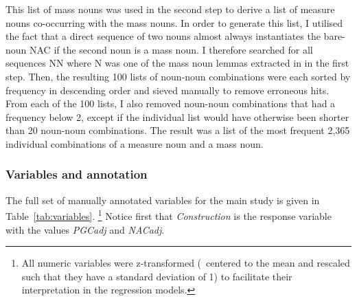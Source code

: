 This list of mass nouns was used in the second step to derive a list of measure nouns co-occurring with the mass nouns. 
In order to generate this list, I utilised the fact that a direct sequence of two nouns almost always instantiates the bare-noun NAC if the second noun is a mass noun.
I therefore searched for all sequences NN where N was one of the mass noun lemmas extracted in in the first step.
Then, the resulting 100 lists of noun-noun combinations were each sorted by frequency in descending order and sieved manually to remove erroneous hits.
From each of the 100 lists, I also removed noun-noun combinations that had a frequency below 2, except if the individual list would have otherwise been shorter than 20 noun-noun combinations.
The result was a list of the most frequent 2,365 individual combinations of a measure noun and a mass noun.


\subsubsection{Variables and annotation}
\label{sec:variablesandannotation}

The full set of manually annotated variables for the main study is given in Table~\ref{tab:variables}.%
\footnote{All numeric variables were z-transformed (\ie\ centered to the mean and rescaled such that they have a standard deviation of 1) to facilitate their interpretation in the regression models.}
Notice first that \textit{Construction} is the response variable with the values \textit{PGCadj} and \textit{NACadj}.

